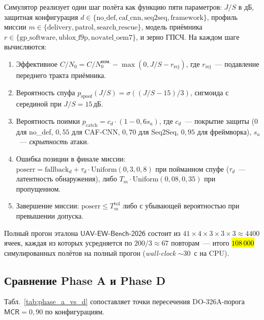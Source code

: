 Симулятор реализует один шаг полёта как функцию пяти параметров:
$J/S$ в дБ, защитная конфигурация $d \in
\{\text{no\_def}, \text{caf\_cnn}, \text{seq2seq}, \text{framework}\}$,
профиль миссии $m \in \{\text{delivery}, \text{patrol},
\text{search\_rescue}\}$, модель приёмника $r \in
\{\text{gp\_software}, \text{ublox\_f9p}, \text{novatel\_oem7}\}$,
и зерно ГПСЧ. На каждом шаге вычисляются:
\begin{enumerate}\setlength\itemsep{0.1em}
\item Эффективное $C/N_0 = C/N_0^{\text{ном.}} - \max(0, J/S - r_{\text{rej}})$,
где $r_{\text{rej}}$~--- подавление переднего тракта приёмника.
\item Вероятность спуфа $p_{\text{spoof}}(J/S) = \sigma((J/S - 15)/3)$,
сигмоида с серединой при $J/S{=}15$\,дБ.
\item Вероятность поимки $p_{\text{catch}} = c_d \cdot (1 - 0{,}6 s_a)$,
где $c_d$~--- покрытие защиты ($0$ для no\_def, $0{,}55$ для CAF-CNN,
$0{,}70$ для Seq2Seq, $0{,}95$ для фреймворка), $s_a$~---
\emph{скрытность} атаки.
\item Ошибка позиции в финале миссии:
$\text{poserr} = \text{fallback}_d + \tau_d \cdot \text{Uniform}(0{,}3, 0{,}8)$
при пойманном спуфе ($\tau_d$~--- латентность обнаружения), либо
$T_m \cdot \text{Uniform}(0{,}08, 0{,}35)$ при пропущенном.
\item Завершение миссии: $\text{poserr} \le T_m^{\text{tol}}$ либо
с убывающей вероятностью при превышении допуска.
\end{enumerate}

Полный прогон эталона $\textsf{UAV-EW-Bench-2026}$ состоит из
$41 \times 4 \times 3 \times 3 \times 3 \approx 4400$ ячеек, каждая
из которых усредняется по $200/3 \approx 67$ повторам~---
итого \hl{$108\,000$} симулированных полётов на полный прогон
(\emph{wall-clock} $\sim$30~с на CPU).

\subsection{Сравнение Phase A и Phase D}
\label{sec:uav_phase_d_comparison}

Табл.~\ref{tab:phase_a_vs_d} сопоставляет точки пересечения
DO-326A-порога $\textsf{MCR}=0{,}90$ по конфигурациям.

